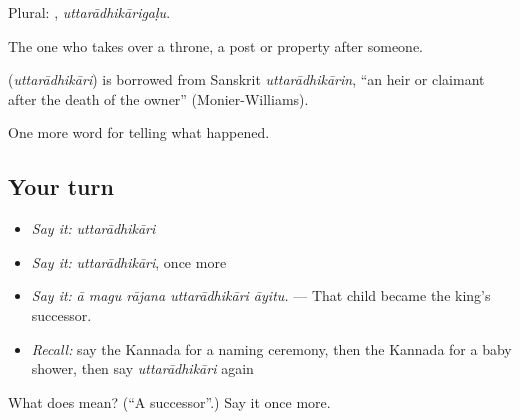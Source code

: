 Plural: , \emph{uttarādhikārigaḷu}.

The one who takes over a throne, a post or property after someone.

\begin{cousinweb}
\textbf{} (\emph{uttarādhikāri}) is borrowed from Sanskrit \emph{uttarādhikārin}, \textquotedblleft{}an heir or claimant after the death of the owner\textquotedblright{} (Monier-Williams).
\end{cousinweb}

\begin{grammarlens}[title={What you've built}]
One more word for telling what happened.
\end{grammarlens}

\subsection*{Your turn}
\begin{itemize}
\raggedright
  \item \emph{Say it:} \emph{uttarādhikāri}
  \item \emph{Say it:} \emph{uttarādhikāri}, once more
  \item \emph{Say it:} \emph{ā magu rājana uttarādhikāri āyitu.} — That child became the king's successor.
  \item \emph{Recall:} say the Kannada for a naming ceremony, then the Kannada for a baby shower, then say \emph{uttarādhikāri} again
\end{itemize}

\begin{tcolorbox}[breakable,colback=teal!4,colframe=teal!35!black,title={Before you move on}]
What does  mean? (\textquotedblleft{}A successor\textquotedblright{}.) Say it once more.
\end{tcolorbox}
